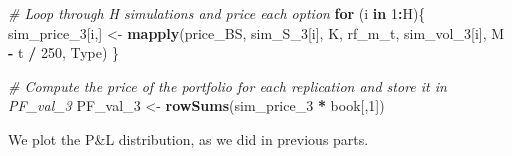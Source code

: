 \documentclass[]{article}
\newenvironment{Shaded}{\begin{snugshade}}{\end{snugshade}}
\newcommand{\CommentTok}[1]{\textcolor[rgb]{0.56,0.35,0.01}{\textit{#1}}}
\newcommand{\ControlFlowTok}[1]{\textcolor[rgb]{0.13,0.29,0.53}{\textbf{#1}}}
\newcommand{\DecValTok}[1]{\textcolor[rgb]{0.00,0.00,0.81}{#1}}
\newcommand{\KeywordTok}[1]{\textcolor[rgb]{0.13,0.29,0.53}{\textbf{#1}}}
\newcommand{\NormalTok}[1]{#1}
\newcommand{\OperatorTok}[1]{\textcolor[rgb]{0.81,0.36,0.00}{\textbf{#1}}}
\newcommand{\StringTok}[1]{\textcolor[rgb]{0.31,0.60,0.02}{#1}}
\begin{document}
\begin{Shaded}
\begin{Highlighting}[]
\CommentTok{\# Loop through H simulations and price each option}
\ControlFlowTok{for}\NormalTok{ (i }\ControlFlowTok{in} \DecValTok{1}\OperatorTok{:}\NormalTok{H)\{}
\NormalTok{  sim\_price\_}\DecValTok{3}\NormalTok{[i,] <{-}}\StringTok{ }\KeywordTok{mapply}\NormalTok{(price\_BS, sim\_S\_}\DecValTok{3}\NormalTok{[i], K, rf\_m\_t, sim\_vol\_}\DecValTok{3}\NormalTok{[i], M }\OperatorTok{{-}}\StringTok{ }\NormalTok{t }\OperatorTok{/}\StringTok{ }\DecValTok{250}\NormalTok{, Type)}
\NormalTok{\}}

\CommentTok{\# Compute the price of the portfolio for each replication and store it in \textquotesingle{}PF\_val\_3\textquotesingle{}}
\NormalTok{PF\_val\_}\DecValTok{3}\NormalTok{ <{-}}\StringTok{ }\KeywordTok{rowSums}\NormalTok{(sim\_price\_}\DecValTok{3} \OperatorTok{*}\StringTok{ }\NormalTok{book[,}\DecValTok{1}\NormalTok{])}
\end{Highlighting}
\end{Shaded}

We plot the P\&L distribution, as we did in previous parts.
\end{document}
